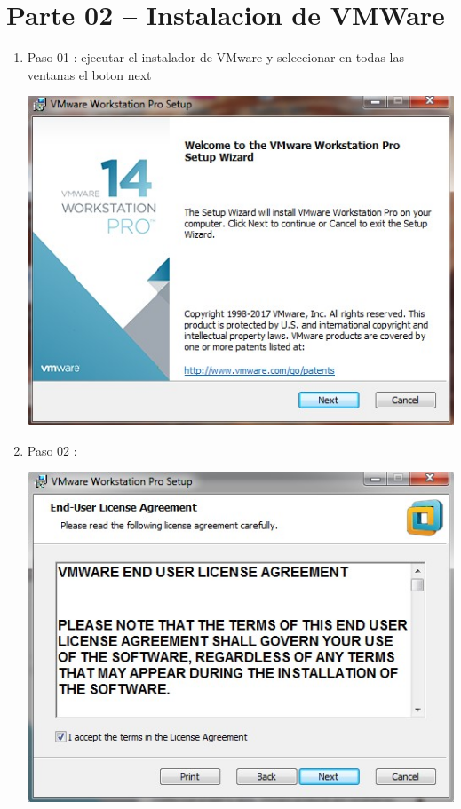 \section{Parte 02 – Instalacion de VMWare} 

\begin{enumerate}[1.]
	\item Paso 01 : ejecutar el instalador de VMware y seleccionar en todas las ventanas el boton next
	
	\begin{center}
	\includegraphics[width=15cm]{./Imagenes/WM01} 
	\end{center}

	\item Paso 02 :

	\begin{center}
	\includegraphics[width=15cm]{./Imagenes/WM02} 
	\end{center}


\end{enumerate}
